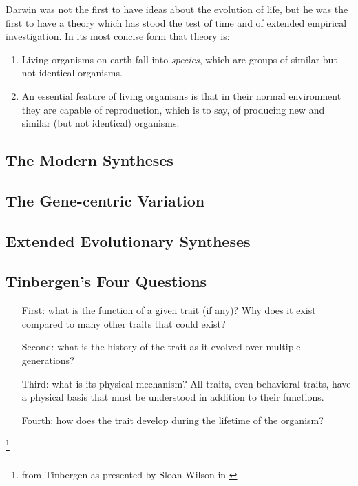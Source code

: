 \documentclass[10pt,titlepage]{book}
\begin{document}
Darwin was not the first to have ideas about the evolution of life, but he was the first to have a theory which has stood the test of time and of extended empirical investigation.
In its most concise form that theory is:
\begin{enumerate}
\item Living organisms on earth fall into \emph{species}, which are groups of similar but not identical organisms.
\item An essential feature of living organisms is that in their normal environment they are capable of reproduction, which is to say, of producing new and similar (but not identical) organisms.
\end{enumerate}

  \subsection{The Modern Syntheses}

  \subsection{The Gene-centric Variation}

  \subsection{Extended Evolutionary Syntheses}

  \subsection{Tinbergen's Four Questions}

  \begin{itemize}
  \item[First:] what is the function of a given trait (if any)? Why does it exist compared to many other traits that could exist?
  \item[Second:] what is the history of the trait as it evolved over multiple generations?
  \item [Third:] what is its physical mechanism? All traits, even behavioral traits, have a physical basis that must be understood in addition to their functions.
    \item [Fourth:] how does the trait develop during the lifetime of the organism?
  \end{itemize}
  \footnote{from Tinbergen \cite{tinbergen-oame} as presented by Sloan Wilson in \cite{wilson-tvl}}
  
\end{document}
